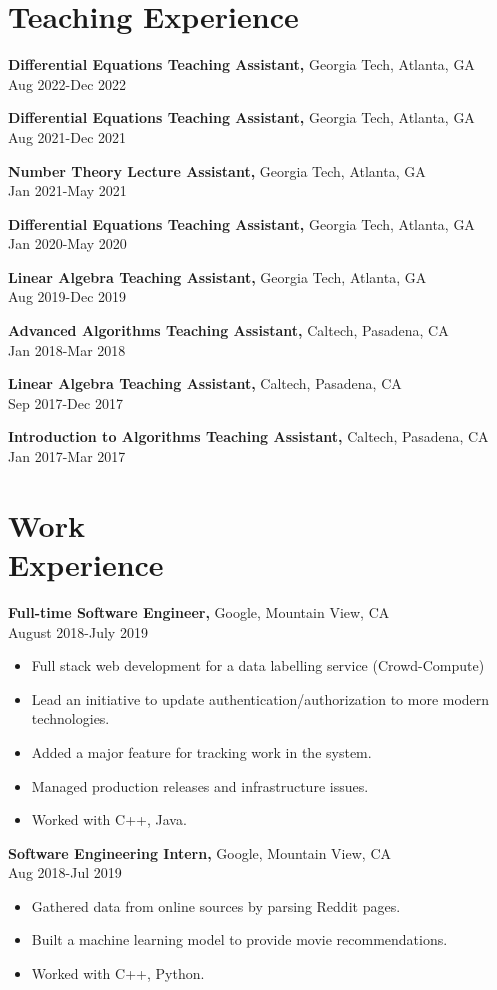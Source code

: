 \documentclass[margin]{res}
\begin{document}
\begin{resume}
\section{Teaching Experience}
{\bf Differential Equations Teaching Assistant,} Georgia Tech, Atlanta, GA \\ Aug 2022-Dec 2022

{\bf Differential Equations Teaching Assistant,} Georgia Tech, Atlanta, GA \\ Aug 2021-Dec 2021

{\bf Number Theory Lecture Assistant,} Georgia Tech, Atlanta, GA \\ Jan 2021-May 2021

{\bf Differential Equations Teaching Assistant,} Georgia Tech, Atlanta, GA \\ Jan 2020-May 2020

{\bf Linear Algebra Teaching Assistant,} Georgia Tech, Atlanta, GA \\ Aug 2019-Dec 2019

{\bf Advanced Algorithms Teaching Assistant,} Caltech, Pasadena, CA \\ Jan 2018-Mar 2018

{\bf Linear Algebra Teaching Assistant,} Caltech, Pasadena, CA \\ Sep 2017-Dec 2017

{\bf Introduction to Algorithms Teaching Assistant,} Caltech, Pasadena, CA \\ Jan 2017-Mar 2017

 \section{Work\\ Experience}
 {\bf Full-time Software Engineer,} Google, Mountain View, CA \\ August 2018-July 2019
 \begin{itemize} \itemsep -2pt  %
 \item Full stack web development for a data labelling service (Crowd-Compute)
 \item Lead an initiative to update authentication/authorization to more modern technologies.
 \item Added a major feature for tracking work in the system.
 \item Managed production releases and infrastructure issues.
 \item Worked with C++, Java.
 \end{itemize}
 
{\bf Software Engineering Intern,} Google, Mountain View, CA \\ Aug 2018-Jul 2019
\begin{itemize} \itemsep -2pt %
\item Gathered data from online sources by parsing Reddit pages.
\item Built a machine learning model to provide movie recommendations.
\item Worked with C++, Python.
\end{itemize}

\end{resume} 
\end{document}
